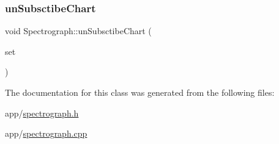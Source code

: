 \subsubsection{\texorpdfstring{un\+Subsctibe\+Chart}{unSubsctibeChart}}
{\footnotesize\ttfamily void Spectrograph\+::un\+Subsctibe\+Chart (\begin{DoxyParamCaption}\item[{Q\+X\+Y\+Series $\ast$}]{set }\end{DoxyParamCaption})\hspace{0.3cm}{\ttfamily [slot]}}



The documentation for this class was generated from the following files\+:\begin{DoxyCompactItemize}
\item 
app/\hyperlink{spectrograph_8h}{spectrograph.\+h}\item 
app/\hyperlink{spectrograph_8cpp}{spectrograph.\+cpp}\end{DoxyCompactItemize}
